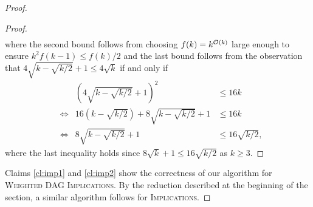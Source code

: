 \documentclass[10pt,a4paper]{article}
\newcommand{\Oh}{{\cal O}}
\newcommand{\Implication}{\textsc{Implications}\xspace}
\newcommand{\wDAGImplication}{\textsc{Weighted DAG Implications}\xspace}
\newcommand{\cqed}{}
\begin{document}
\begin{proof}
\begin{proof}
\begin{align*}
  \end{align*}
 where the second bound follows from choosing $f(k) = k^{\Oh(k)}$ large enough to ensure $k^2f(k-1) \le f(k)/2$ and 
 the last bound follows from the observation that $4\sqrt{k-\sqrt{k/2}} + 1\le 4\sqrt{k}$ if and only if 
   \begin{align*}
& &  \left(4\sqrt{k-\sqrt{k/2}} + 1\right)^2 & \le 16k\\
& \iff & 16(k-\sqrt{k/2}) + 8\sqrt{k-\sqrt{k/2}} + 1 & \le 16k\\
& \iff & 8\sqrt{k-\sqrt{k/2}} + 1 & \le 16\sqrt{k/2},
  \end{align*}
  where the last inequality holds since $8\sqrt{k}+1 \le 16\sqrt{k/2}$ as $k\ge 3$.
  \cqed\end{proof}
Claims \ref{cl:imp1} and \ref{cl:imp2} show the correctness of our algorithm for \wDAGImplication. By the reduction described at the beginning of the section, a similar algorithm follows for \Implication.
\end{proof}
\end{document}
